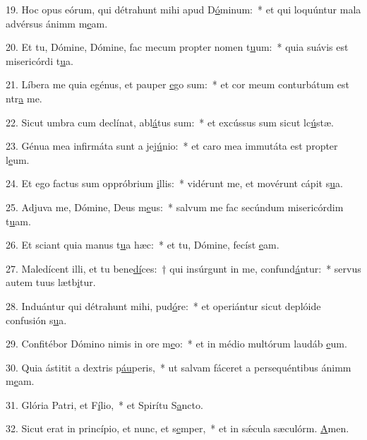 19. Hoc opus eórum, qui détrahunt mihi apud D\uline{ó}minum:~* et qui loquúntur mala advérsus ánimm m\uline{e}am.\par 
20. Et tu, Dómine, Dómine, fac mecum propter nomen t\uline{u}um:~* quia suávis est misericórdi t\uline{u}a.\par 
21. Líbera me quia egénus, et pauper \uline{e}go sum:~* et cor meum conturbátum est ntr\uline{a} me.\par 
22. Sicut umbra cum declínat, abl\uline{á}tus sum:~* et excússus sum sicut lc\uline{ú}stæ.\par 
23. Génua mea infirmáta sunt a jej\uline{ú}nio:~* et caro mea immutáta est propter l\uline{e}um.\par 
24. Et ego factus sum oppróbrium \uline{i}llis:~* vidérunt me, et movérunt cápit s\uline{u}a.\par 
25. Adjuva me, Dómine, Deus m\uline{e}us:~* salvum me fac secúndum misericórdim t\uline{u}am.\par 
26. Et sciant quia manus t\uline{u}a hæc:~* et tu, Dómine, fecíst \uline{e}am.\par 
27. Maledícent illi, et tu bene\uline{dí}ces:~† qui insúrgunt in me, confund\uline{á}ntur:~* servus autem tuus lætb\uline{i}tur.\par 
28. Induántur qui détrahunt mihi, pud\uline{ó}re:~* et operiántur sicut deplóide confusión s\uline{u}a.\par 
29. Confitébor Dómino nimis in ore m\uline{e}o:~* et in médio multórum laudáb \uline{e}um.\par 
30. Quia ástitit a dextris p\uline{áu}peris,~* ut salvam fáceret a persequéntibus ánimm m\uline{e}am.\par 
31. Glória Patri, et F\uline{í}lio,~* et Spirítu S\uline{a}ncto.\par 
32. Sicut erat in princípio, et nunc, et s\uline{e}mper,~* et in sǽcula sæculórm. \uline{A}men.\par 

